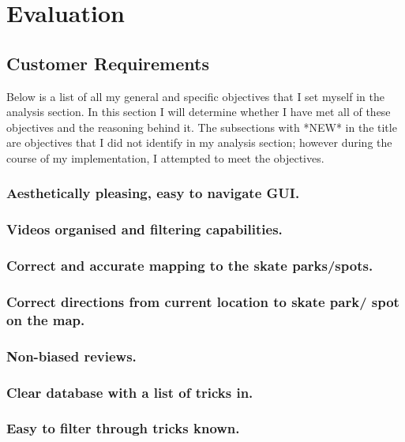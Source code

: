 \chapter{Evaluation}

\section{Customer Requirements}

Below is a list of all my general and specific objectives that I set myself in the analysis section. In this section I will determine whether I have met all of these objectives and the reasoning behind it. The subsections with *NEW* in the title are objectives that I did not identify in my analysis section; however during the course of my implementation, I attempted to meet the objectives. 

\subsection{Aesthetically pleasing, easy to navigate GUI.}

\subsection{Videos organised and filtering capabilities.}

\subsection{Correct and accurate mapping to the skate parks/spots.}

\subsection {Correct directions from current location to skate park/ spot on the map.}

\subsection{Non-biased reviews.}

\subsection{Clear database with a list of tricks in.}

\subsection{ Easy to filter through tricks known.}

